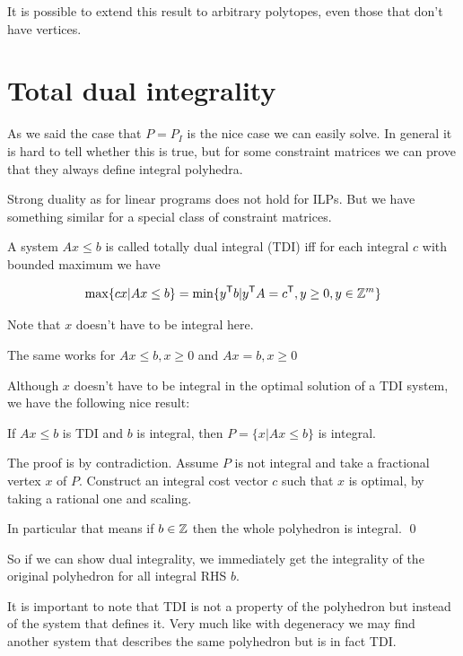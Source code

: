 It is possible to extend this result to arbitrary polytopes, even those that don't have vertices.


\section{Total dual integrality}

As we said the case that $P=P_I$ is the nice case we can easily solve. In general it is hard to tell whether this is true, but for some constraint matrices we can prove that they always define integral polyhedra.

Strong duality as for linear programs does not hold for ILPs. But we have something similar for a special class of constraint matrices.

\begin{Def} A system $Ax\leq b$ is called totally dual integral (TDI) iff for each integral $c$ with bounded maximum we have

\[\max \{cx |Ax\leq b\} = \min \{{y}^\text{\upshape \sffamily T} b | {y}^\text{\upshape \sffamily T} A = {c}^\text{\upshape \sffamily T}, y\geq 0, y\in \mathbb{Z}^m\}\]

Note that $x$ doesn't have to be integral here.

The same works for $Ax\leq b, x\geq 0$ and $Ax=b, x\geq 0$
\end{Def}

Although $x$ doesn't have to be integral in the optimal solution of a TDI system, we have the following nice result:

\begin{thm} If $Ax\leq b$ is TDI and $b$ is integral, then $P=\{x|Ax\leq b\}$ is integral.
\end{thm}

\begin{pr} The proof is by contradiction. Assume $P$ is not integral and take a fractional vertex $x$ of $P$. Construct an integral cost vector $c$ such that $x$ is optimal, by taking a rational one and scaling.

In particular that means if $b\in \mathbb{Z}$ then the whole polyhedron is integral.
\qed \end{pr}

So if we can show dual integrality, we immediately get the integrality of the original polyhedron for all integral RHS $b$.

It is important to note that TDI is not a property of the polyhedron but instead of the system that defines it. Very much like with degeneracy we may find another system that describes the same polyhedron but is in fact TDI. 

